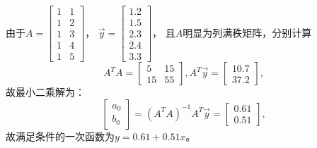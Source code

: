 由于$A=\begin{bmatrix}1&1\\1&2\\1&3\\1&4\\1&5\end{bmatrix}$，
$\vec{y}=\begin{bmatrix}1.2\\1.5\\2.3\\2.4\\3.3\end{bmatrix}$，
且$A$明显为列满秩矩阵，分别计算
\begin{equation*}
A^TA=\begin{bmatrix}5&15\\15&55\end{bmatrix},
A^T\vec{y}=\begin{bmatrix}10.7\\37.2\end{bmatrix},
\end{equation*}
故最小二乘解为：
\begin{equation*}
\begin{bmatrix}a_0\\b_0\end{bmatrix}=
(A^TA)^{-1}A^T\vec{y}=\begin{bmatrix}0.61\\0.51\end{bmatrix},
\end{equation*}
故满足条件的一次函数为$y=0.61+0.51x$。


